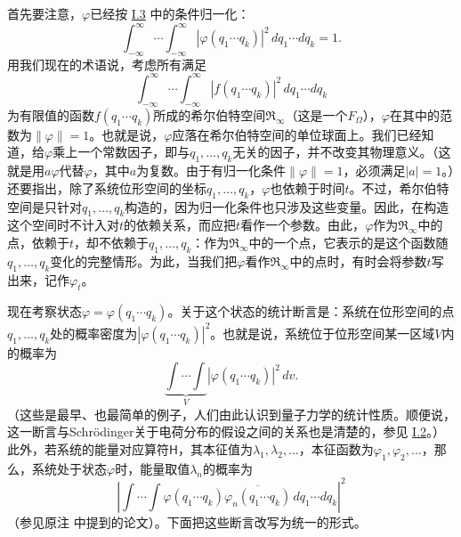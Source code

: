 \documentclass[fontsize=13pt,twoside,openany,headings=normal,parskip=false,bookmarkpackage=false,DIV=calc]{scrbook}
\begin{document}
首先要注意，$\varphi$已经按 \hyperref[sec:I.3]{I.3} 中的条件归一化：
\[
\int_{-\infty}^{\infty}\cdots\int_{-\infty}^{\infty}
|\varphi(q_1\cdots q_k)|^2\,dq_1\cdots dq_k=1.
\]
用我们现在的术语说，考虑所有满足
\[
\int_{-\infty}^{\infty}\cdots\int_{-\infty}^{\infty}
|f(q_1\cdots q_k)|^2\,dq_1\cdots dq_k
\]
为有限值的函数$f(q_1\cdots q_k)$所成的希尔伯特空间$\mathfrak R_\infty$（这是一个$F_\Omega$），$\varphi$在其中的范数为$\|\varphi\|=1$。也就是说，$\varphi$应落在希尔伯特空间的单位球面上。我们已经知道，给$\varphi$乘上一个常数因子，即与$q_1,\allowbreak \ldots,\allowbreak q_k$无关的因子，并不改变其物理意义。（这就是用$a\varphi$代替$\varphi$，其中$a$为复数。由于有归一化条件$\|\varphi\|=1$，必须满足$|a|=1$。）还要指出，除了系统位形空间的坐标$q_1,\allowbreak \ldots,\allowbreak q_k$，$\varphi$也依赖于时间$t$。不过，希尔伯特空间是只针对$q_1,\allowbreak \ldots,\allowbreak q_k$构造的，因为归一化条件也只涉及这些变量。因此，在构造这个空间时不计入对$t$的依赖关系，而应把$t$看作一个参数。由此，$\varphi$作为$\mathfrak R_\infty$中的点，依赖于$t$，却不依赖于$q_1,\allowbreak \ldots,\allowbreak q_k$：作为$\mathfrak R_\infty$中的一个点，它表示的是这个函数随$q_1,\allowbreak \ldots,\allowbreak q_k$变化的完整情形。为此，当我们把$\varphi$看作$\mathfrak R_\infty$中的点时，有时会将参数$t$写出来，记作$\varphi_t$。

现在考察状态$\varphi=\varphi(q_1\cdots q_k)$。关于这个状态的统计断言是：系统在位形空间的点$q_1,\allowbreak \ldots,\allowbreak q_k$处的概率密度为$|\varphi(q_1\cdots q_k)|^2$。也就是说，系统位于位形空间某一区域$V$内的概率为
\[
\underbrace{\int\cdots\int}_{V}|\varphi(q_1\cdots q_k)|^2\,dv.
\]
（这些是最早、也最简单的例子，人们由此认识到量子力学的统计性质。顺便说，这一断言与Schrödinger关于电荷分布的假设之间的关系也是清楚的，参见 \hyperref[sec:I.2]{I.2}。）\hypertarget{origpage-103}{}\label{origpage-103}此外，若系统的能量对应算符$\mathsf H$，其本征值为$\lambda_1,\allowbreak \lambda_2,\allowbreak \ldots$，本征函数为$\varphi_1,\allowbreak \varphi_2,\allowbreak \ldots$，那么，系统处于状态$\varphi$时，能量取值$\lambda_n$的概率为
\[
\left|\int\cdots\int\varphi(q_1\cdots q_k)
\overline{\varphi_n(q_1\cdots q_k)}\,dq_1\cdots dq_k\right|^2
\]
（参见原注 \hyperlink{note-118}{} 中提到的论文）。下面把这些断言改写为统一的形式。
\end{document}

